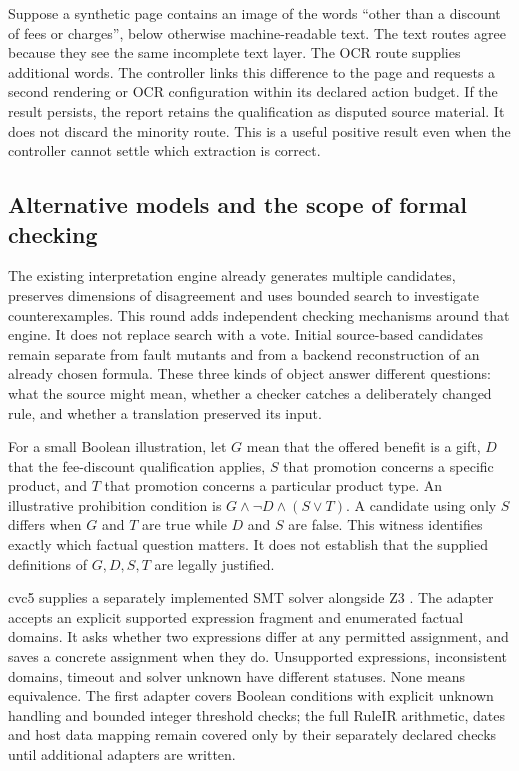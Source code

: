 Suppose a synthetic page contains an image of the words ``other than a discount
of fees or charges'', below otherwise machine-readable text. The text routes
agree because they see the same incomplete text layer. The OCR route supplies
additional words. The controller links this difference to the page and requests
a second rendering or OCR configuration within its declared action budget. If
the result persists, the report retains the qualification as disputed source
material. It does not discard the minority route. This is a useful positive
result even when the controller cannot settle which extraction is correct.

\subsection{Alternative models and the scope of formal checking}

The existing interpretation engine already generates multiple candidates,
preserves dimensions of disagreement and uses bounded search to investigate
counterexamples. This round adds independent checking mechanisms around that
engine. It does not replace search with a vote. Initial source-based candidates
remain separate from fault mutants and from a backend reconstruction of an
already chosen formula. These three kinds of object answer different questions:
what the source might mean, whether a checker catches a deliberately changed
rule, and whether a translation preserved its input.

For a small Boolean illustration, let $G$ mean that the offered benefit is a
gift, $D$ that the fee-discount qualification applies, $S$ that promotion concerns
a specific product, and $T$ that promotion concerns a particular product type.
An illustrative prohibition condition is $G\land\neg D\land(S\lor T)$. A
candidate using only $S$ differs when $G$ and $T$ are true while $D$ and $S$ are
false. This witness identifies exactly which factual question matters. It does
not establish that the supplied definitions of $G,D,S,T$ are legally justified.

cvc5 supplies a separately implemented SMT solver alongside Z3
\citep{cvc5software}. The adapter accepts an explicit supported expression
fragment and enumerated factual domains. It asks whether two expressions differ
at any permitted assignment, and saves a concrete assignment when they do.
Unsupported expressions, inconsistent domains, timeout and solver unknown have
different statuses. None means equivalence. The first adapter covers Boolean
conditions with explicit unknown handling and bounded integer threshold checks;
the full RuleIR arithmetic, dates and host data mapping remain covered only by
their separately declared checks until additional adapters are written.


